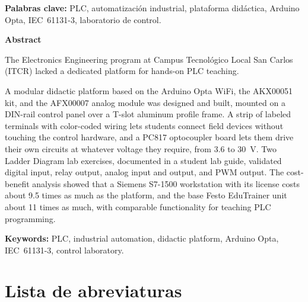 \documentclass[12pt,a4paper,oneside]{report}
\begin{document}
\textbf{Palabras clave:} PLC, automatización industrial, plataforma didáctica, Arduino Opta,
IEC~61131-3, laboratorio de control.

\clearpage

\thispagestyle{empty}

\begin{center}
    {\large\bfseries\color{DeepBlue} Abstract}
\end{center}

\vspace{0.5cm}

The Electronics Engineering program at Campus Tecnológico Local San Carlos (ITCR) lacked a
dedicated platform for hands-on PLC teaching.

A modular didactic platform based on the Arduino Opta WiFi, the AKX00051 kit, and the AFX00007
analog module was designed and built, mounted on a DIN-rail control panel over a T-slot
aluminum profile frame. A strip of labeled terminals with color-coded wiring lets students
connect field devices without touching the control hardware, and a PC817 optocoupler board
lets them drive their own circuits at whatever voltage they require, from 3.6 to 30~V. Two Ladder Diagram lab
exercises, documented in a student lab guide, validated digital input, relay output, analog
input and output, and PWM output. The cost-benefit analysis showed that a Siemens S7-1500
workstation with its license costs about 9.5 times as much as the platform, and the base Festo
EduTrainer unit about 11 times as much, with comparable functionality for teaching PLC
programming.

\textbf{Keywords:} PLC, industrial automation, didactic platform, Arduino Opta, IEC~61131-3,
control laboratory.

\clearpage

\pagestyle{fancy}
\tableofcontents
\listoffigures
\listoftables

\clearpage

\section*{Lista de abreviaturas}
\end{document}
